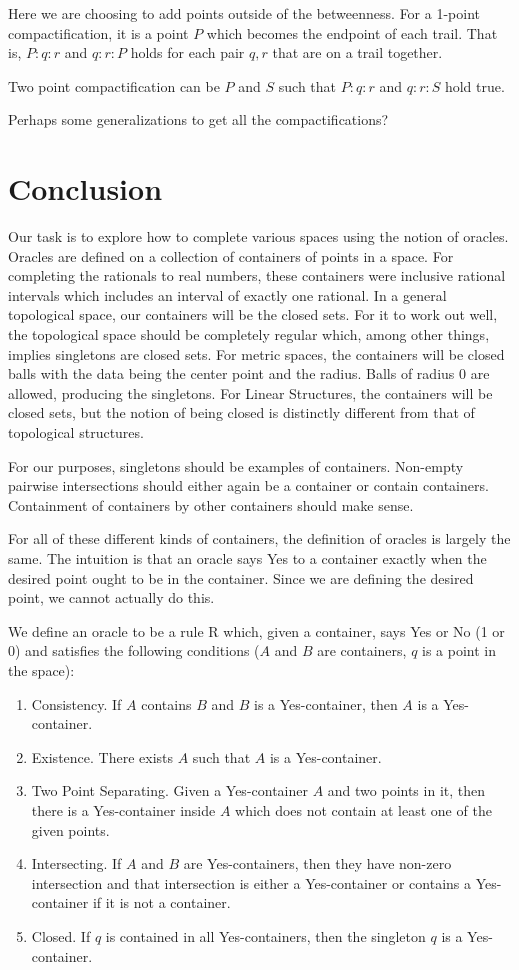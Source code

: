 \documentclass[12pt]{article}
\begin{document}
Here we are choosing to add points outside of the betweenness. For a 1-point compactification, it is a point $P$ which becomes the endpoint of each trail. That is, $P:q:r$ and $q:r:P$ holds for each pair $q,r$ that are on a trail together. 

Two point compactification can be $P$ and $S$ such that $P:q:r$ and $q:r:S$ hold true. 

Perhaps some generalizations to get all the compactifications? 

\section{Conclusion}


Our task is to explore how to complete various spaces using the notion of oracles. Oracles are defined on a collection of containers of points in a space. For completing the rationals to real numbers, these containers were inclusive rational intervals which includes an interval of exactly one rational. In a general topological space, our containers will be the closed sets. For it to work out well, the topological space should be completely regular which, among other things, implies singletons are closed sets. For metric spaces, the containers will be closed balls with the data being the center point and the radius. Balls of radius 0 are allowed, producing the singletons. For Linear Structures, the containers will be closed sets, but the notion of being closed is distinctly different from that of topological structures. 

For our purposes, singletons should be examples of containers. Non-empty pairwise intersections should either again be a container or contain containers. Containment of containers by other containers should make sense. 

For all of these different kinds of containers, the definition of oracles is largely the same. The intuition is that an oracle says Yes to a container exactly when the desired point ought to be in the container. Since we are defining the desired point, we cannot actually do this. 

We define an oracle to be a rule R which, given a container, says Yes or No (1 or 0) and satisfies the following conditions ($A$ and $B$ are containers, $q$ is a point in the space): 
\begin{enumerate}
    \item Consistency. If $A$ contains $B$ and $B$ is a Yes-container, then $A$ is a Yes-container.
    \item Existence. There exists $A$ such that $A$ is a Yes-container.
    \item Two Point Separating. Given a Yes-container $A$ and two points in it, then there is a Yes-container inside $A$ which does not contain at least one of the given points. 
    \item Intersecting. If $A$ and $B$ are Yes-containers, then they have non-zero intersection and that intersection is either a Yes-container or contains a Yes-container if it is not a container. 
    \item Closed. If $q$ is contained in all Yes-containers, then the singleton $q$ is a Yes-container. 
\end{enumerate}
\end{document}
